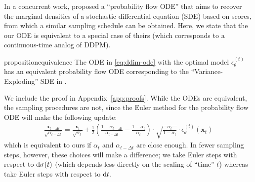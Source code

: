 In a concurrent work, \citep{song2020score} proposed a ``probability flow ODE'' that aims to recover the marginal densities of a stochastic differential equation (SDE) based on scores, from which a similar sampling schedule can be obtained. Here, we state that the our ODE is equivalent to a special case of theirs (which corresponds to a continuous-time analog of DDPM).
\begin{restatable}{proposition}{equivalence}
The ODE in \eqref{eq:ddim-ode} with the optimal model $\epsilon_\theta^{(t)}$ has an equivalent probability flow ODE corresponding to the ``Variance-Exploding'' SDE in \citet{song2020score}.
\end{restatable}
We include the proof in Appendix~\ref{app:proofs}. While the ODEs are equivalent, the sampling procedures are not, since the Euler method for the probability flow ODE will make the following update:
\begin{align}
    \frac{\bm{x}_{t-\Delta t}}{\sqrt{\alpha_{t-\Delta t}}}  = \frac{\bm{x}_t}{\sqrt{\alpha_t}}  + \frac{1}{2}\left(\frac{1 - \alpha_{t-\Delta t}}{\alpha_{t-\Delta t}} - \frac{1 - \alpha_{t}}{\alpha_t}\right) \cdot \sqrt{\frac{\alpha_t}{1 - \alpha_t}} \cdot \epsilon_\theta^{(t)}(\bm{x}_t) \label{eq:pf-euler}
\end{align}
which is equivalent to ours if $\alpha_t$ and $\alpha_{t-\Delta t}$ are close enough. In fewer sampling steps, however, these choices will make a difference; we take Euler steps with respect to $\mathrm{d} \sigma(t)$ (which depends less directly on the scaling of ``time'' $t$) whereas \citet{song2020score} take Euler steps with respect to $\mathrm{d} t$.



